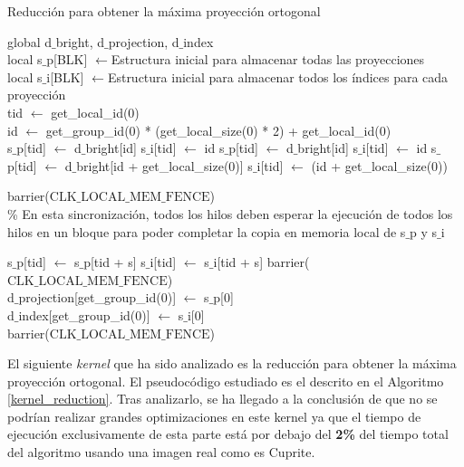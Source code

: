 \begin{algorithm}[htb]\small
\caption{Reducción para obtener la máxima proyección ortogonal}
\begin{algorithmic}[1]
\label{kernel_reduction}
\STATE global d$\_$bright, d$\_$projection, d$\_$index\\
\STATE local s$\_$p[BLK] $\leftarrow{}$Estructura inicial para almacenar todas las proyecciones\\
\STATE local s$\_$i[BLK] $\leftarrow{}$Estructura inicial para almacenar todos los índices para cada proyección\\
\STATE tid $\leftarrow{}$ get\_local\_id(0)\\
\STATE id $\leftarrow{}$ get\_group\_id(0)  * (get\_local\_size(0) * 2) + get\_local\_id(0)\\
	\STATE s$\_$p[tid] $\leftarrow{}$ d$\_$bright[id]
	\STATE s$\_$i[tid] $\leftarrow{}$ id
\ELSE
		\STATE s$\_$p[tid] $\leftarrow{}$ d$\_$bright[id]
		\STATE s$\_$i[tid] $\leftarrow{}$ id
    \ELSE
    	\STATE s$\_$p[tid] $\leftarrow{}$ d$\_$bright[id + get\_local\_size(0)]
		\STATE s$\_$i[tid] $\leftarrow{}$ (id + get\_local\_size(0))
	\ENDIF
\ENDIF

\STATE barrier($\text{CLK\_LOCAL\_MEM\_FENCE}$)\\

\% En esta sincronización, todos los hilos deben esperar la ejecución de todos los hilos en un bloque para poder completar la copia en memoria local de s$\_$p y s$\_$i

    		\STATE s$\_$p[tid] $\leftarrow{}$ s$\_$p[tid + s]
			\STATE s$\_$i[tid] $\leftarrow{}$ s$\_$i[tid + s]
		\ENDIF
    \ENDIF
    \STATE barrier($\text{CLK\_LOCAL\_MEM\_FENCE}$)\\
\ENDFOR
\STATE d$\_$projection[get\_group\_id(0)] $\leftarrow{}$ s$\_$p[0]\\
\STATE d$\_$index[get\_group\_id(0)] $\leftarrow{}$ s$\_$i[0]\\
\STATE barrier($\text{CLK\_LOCAL\_MEM\_FENCE}$)\\
\end{algorithmic}
\end{algorithm}

El siguiente \textit{kernel} que ha sido analizado es la reducción para obtener la máxima proyección ortogonal. El pseudocódigo estudiado es el descrito en el Algoritmo \ref{kernel_reduction}. Tras analizarlo, se ha llegado a la conclusión de que no se podrían realizar grandes optimizaciones en este kernel ya que el tiempo de ejecución exclusivamente de esta parte está por debajo del \textbf{2\%} del tiempo total del algoritmo usando una imagen real como es Cuprite.

